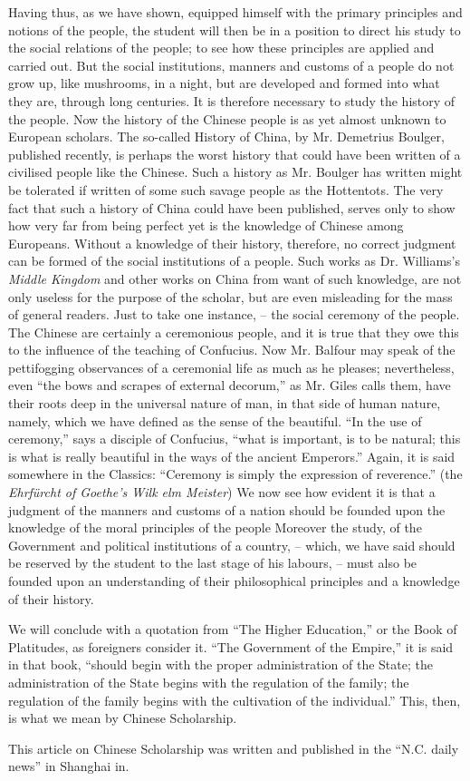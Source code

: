 Having thus, as we have shown, equipped himself with the primary principles and notions of the people,
the student will then be in a position to direct his study to the social relations of the people;
to see how these principles are applied and carried out.
But the social institutions, manners and customs of a people do not grow up,
like mushrooms, in a night,
but are developed and formed into what they are, through long centuries.
It is therefore necessary to study the history of the people.
Now the history of the Chinese people is as yet almost unknown to European scholars.
The so-called History of China,
by Mr. Demetrius Boulger, published recently,
is perhaps the worst history that could have been written of a civilised people like the Chinese.
Such a history as Mr. Boulger has written might be tolerated if written of some such savage people as the Hottentots.
The very fact that such a history of China could have been published,
serves only to show how very far from being perfect yet is the knowledge of Chinese among Europeans.
Without a knowledge of their history, therefore, no correct judgment can be formed of the social institutions of a people.
Such works as Dr. Williams's \emph{Middle Kingdom} and other works on China from want of such knowledge,
are not only useless for the purpose of the scholar,
but are even misleading for the mass of general readers.
Just to take one instance,
-- the social ceremony of the people. The Chinese are certainly a ceremonious people,
and it is true that they owe this to the influence of the teaching of Confucius.
Now Mr. Balfour may speak of the pettifogging observances of a ceremonial life as much as he pleases;
nevertheless, even
``the bows and scrapes of external decorum,'' as Mr. Giles calls them,
have their roots deep in the universal nature of man,
in that side of human nature, namely,
which we have defined as the sense of the beautiful.
``In the use of ceremony,'' says a disciple of Confucius,
``what is important, is to be natural; this is what is really beautiful in the ways of the ancient Emperors.''
Again, it is said somewhere in the Classics:
``Ceremony is simply the expression of reverence.''
(the \emph{Ehrf\"urcht of Goethe's Wilk elm Meister})
We now see how evident it is that a judgment of the manners and customs of a nation
should be founded upon the knowledge of the moral principles of the people
Moreover the study, of the Government and political institutions of a country,
-- which, we have said should be reserved by the student to the last stage of his labours,
-- must also be founded upon an understanding of their philosophical principles
and a knowledge of their history.

We will conclude with a quotation from ``The Higher Education,''
or the Book of Platitudes, as foreigners consider it.
``The Government of the Empire,''
it is said in that book, ``should begin with the proper administration of the State;
the administration of the State begins with the regulation of the family;
the regulation of the family begins with the cultivation of the individual.''
This, then, is what we mean by Chinese Scholarship.

This article on Chinese Scholarship was written and published
in the ``N.C. daily news'' in Shanghai in.
